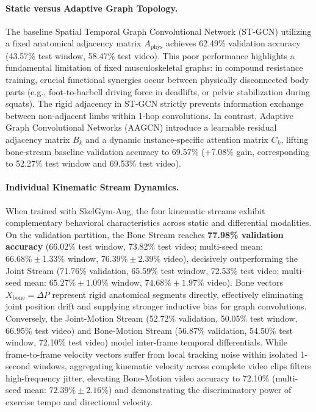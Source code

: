\documentclass[preprint,12pt]{elsarticle}
\begin{document}
\paragraph{Static versus Adaptive Graph Topology.} The baseline Spatial Temporal Graph Convolutional Network (ST-GCN) utilizing a fixed anatomical adjacency matrix $A_{\text{phys}}$ achieves 62.49\% validation accuracy (43.57\% test window, 58.47\% test video). This poor performance highlights a fundamental limitation of fixed musculoskeletal graphs: in compound resistance training, crucial functional synergies occur between physically disconnected body parts (e.g., foot-to-barbell driving force in deadlifts, or pelvic stabilization during squats). The rigid adjacency in ST-GCN strictly prevents information exchange between non-adjacent limbs within 1-hop convolutions. In contrast, Adaptive Graph Convolutional Networks (AAGCN) introduce a learnable residual adjacency matrix $B_k$ and a dynamic instance-specific attention matrix $C_k$, lifting bone-stream baseline validation accuracy to 69.57\% (+7.08\% gain, corresponding to 52.27\% test window and 69.53\% test video).

\paragraph{Individual Kinematic Stream Dynamics.} When trained with SkelGym-Aug, the four kinematic streams exhibit complementary behavioral characteristics across static and differential modalities. On the validation partition, the Bone Stream reaches \textbf{77.98\% validation accuracy} (66.02\% test window, 73.82\% test video; multi-seed mean: $66.68\% \pm 1.33\%$ window, $76.39\% \pm 2.39\%$ video), decisively outperforming the Joint Stream (71.76\% validation, 65.59\% test window, 72.53\% test video; multi-seed mean: $65.27\% \pm 1.09\%$ window, $74.68\% \pm 1.97\%$ video). Bone vectors $X_{\text{bone}} = \Delta P$ represent rigid anatomical segments directly, effectively eliminating joint position drift and supplying stronger inductive bias for graph convolutions. Conversely, the Joint-Motion Stream (52.72\% validation, 50.05\% test window, 66.95\% test video) and Bone-Motion Stream (56.87\% validation, 54.50\% test window, 72.10\% test video) model inter-frame temporal differentials. While frame-to-frame velocity vectors suffer from local tracking noise within isolated 1-second windows, aggregating kinematic velocity across complete video clips filters high-frequency jitter, elevating Bone-Motion video accuracy to 72.10\% (multi-seed mean: $72.39\% \pm 2.16\%$) and demonstrating the discriminatory power of exercise tempo and directional velocity.
\end{document}
